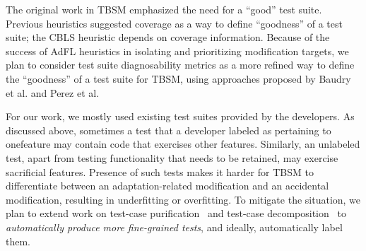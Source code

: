 The original work in TBSM emphasized the need for a ``good'' test suite. Previous heuristics suggested coverage as a way to define “goodness” of a test suite; the CBLS heuristic depends on coverage information. Because of the success of AdFL heuristics in isolating and prioritizing modification targets, we plan to consider test suite diagnosability metrics as a more refined way to define the “goodness” of a test suite for TBSM, using approaches proposed by Baudry et al. and Perez et al.~\cite{Baudry2006improving,perez2017diagnosibility}

For our work, we mostly used existing test suites provided by the developers. As discussed above, sometimes a test that a developer labeled as pertaining to onefeature may contain code that exercises other features. Similarly, an unlabeled test, apart from testing functionality that needs to be retained, may exercise sacrificial features.  Presence of such tests makes it harder for TBSM to differentiate between an adaptation-related modification and an accidental modification, resulting in underfitting or overfitting. To mitigate the situation, we plan to extend work on test-case purification~\cite{xuan2014test}  and test-case decomposition~\cite{stvrcausereduce,christi18reduce} to \emph{automatically produce more fine-grained tests}, and ideally, automatically label them.
